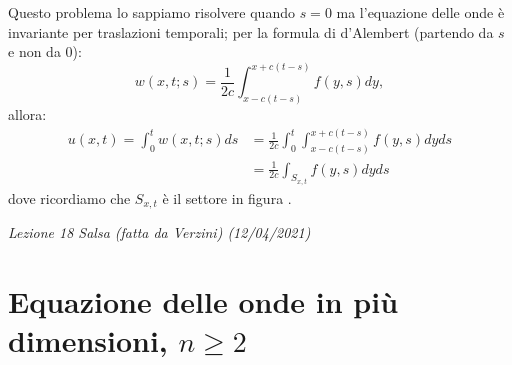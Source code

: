 \documentclass[10pt,a4paper,twoside,openright]{book}
\begin{document}
Questo problema lo sappiamo risolvere quando $\displaystyle s=0$ ma l'equazione delle onde è invariante per traslazioni temporali; per la formula di d'Alembert (partendo da $\displaystyle s$ e non da $\displaystyle 0$):
\begin{equation*}
	w( x,t;s) =\frac{1}{2c}\int _{x-c( t-s)}^{x+c( t-s)} f( y,s) dy,
\end{equation*}
allora:
\begin{align*}
	u( x,t) =\int _{0}^{t} w( x,t;s) ds & =\frac{1}{2c}\int _{0}^{t}\int _{x-c( t-s)}^{x+c( t-s)} f( y,s) dyds \\
	                                    & =\frac{1}{2c}\int _{S_{x,t}} f( y,s) dyds                            
\end{align*}
dove ricordiamo che $\displaystyle S_{x,t}$ è il settore in figura .


\textit{Lezione 18 Salsa (fatta da Verzini) (12/04/2021)}
\section{Equazione delle onde in più dimensioni, \texorpdfstring{$n\geqslant 2$}{n>2}}
\end{document}
